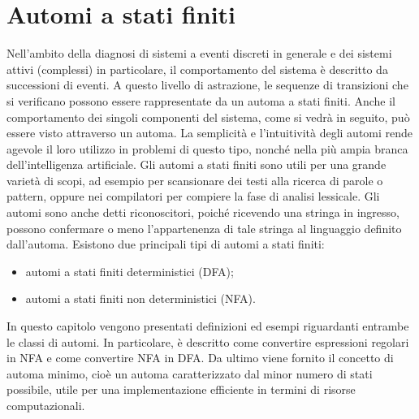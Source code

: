 \chapter{Automi a stati finiti}
Nell'ambito della diagnosi di sistemi a eventi discreti in generale e dei sistemi attivi (complessi) in particolare, il comportamento del sistema è descritto da successioni di eventi. A questo livello di astrazione, le sequenze di transizioni che si verificano possono essere rappresentate da un automa a stati finiti. Anche il comportamento dei singoli componenti del sistema, come si vedrà in seguito, può essere visto attraverso un automa. La semplicità e l'intuitività degli automi rende agevole il loro utilizzo in problemi di questo tipo, nonché nella più ampia branca dell'intelligenza artificiale.
Gli automi a stati finiti sono utili per una grande varietà di scopi, ad esempio per scansionare dei testi alla ricerca di parole o pattern, oppure nei compilatori per compiere la fase di analisi lessicale.
Gli automi sono anche detti riconoscitori, poiché ricevendo una stringa in ingresso, possono confermare o meno l'appartenenza di tale stringa al linguaggio definito dall'automa.
Esistono due principali tipi di automi a stati finiti:
\begin{itemize}
\item automi a stati finiti deterministici (DFA);
\item automi a stati finiti non deterministici (NFA).
\end{itemize}
In questo capitolo vengono presentati definizioni ed esempi riguardanti entrambe le classi di automi. In particolare, è descritto come convertire espressioni regolari in NFA e come convertire NFA in DFA.
Da ultimo viene fornito il concetto di automa minimo, cioè un automa caratterizzato dal minor numero di stati possibile, utile per una implementazione efficiente in termini di risorse computazionali.

\newpage
